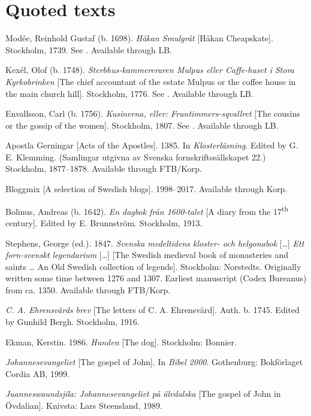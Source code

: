 \documentclass[output=paper]{langscibook}
\begin{document}
\section*{Quoted texts}
\begin{description}[font=\normalfont]\sloppy
\item[1dSMUL:] Modée, Reinhold Gustaf (b. 1698). \textit{Håkan Smulgråt} [Håkan Cheapskate]. Stockholm, 1739. See  \citet{MarttalaStromquist2001}. Available through LB.
\item[2aSTERBH:] Kexél, Olof (b. 1748). \textit{Sterbhus-kammereraren Mulpus eller Caffe-huset i Stora Kyrkobrinken} [The chief accountant of the estate Mulpus or the coffee house in the main church hill]. Stockholm, 1776. See \citet{MarttalaStromquist2001}. Available through LB.
\item[2cKUSINE:] Envallsson, Carl (b. 1756). \textit{Kusinerna, eller: Fruntimmers-sqvallret} [The cousins or the gossip of the women]. Stockholm, 1807. See \citet{MarttalaStromquist2001}. Available through LB.
\item[ApG:] Apostla Gerningar [Acts of the Apostles]. 1385. In \textit{Klosterläsning}. Edited by G. E. Klemming. (Samlingar utgivna av Svenska fornskriftssällskapet 22.) Stockholm, 1877–1878. Available through FTB\slash Korp.
\item[Blogg:] Bloggmix [A selection of Swedish blogs]. 1998–2017. Available through Korp.
\item[Bol:] Bolinus, Andreas (b. 1642). \textit{En dagbok från 1600-talet} [A diary from the 17\textsuperscript{th} century]. Edited by E. Brunnström. Stockholm, 1913. 
\item[Leg:] Stephens, George (ed.). 1847. \textit{Svenska medeltidens kloster- och helgonabok} […] \textit{Ett forn-svenskt legendarium} […] [The Swedish medieval book of monasteries and saints … An Old Swedish collection of legends]. Stockholm: Norstedts. Originally written some time between 1276 and 1307. Earliest manuscript (Codex Bureanus) from ca. 1350. Available through FTB\slash Korp.
\item[Ehrensvärd:] \textit{C. A. Ehrensvärds brev} [The letters of C. A. Ehrensvärd]. Auth. b. 1745. Edited by Gunhild Bergh. Stockholm, 1916.
\item[Hunden:] Ekman, Kerstin. 1986. \textit{Hunden} [The dog]. Stockholm: Bonnier. 
\item[Joh.:] \textit{Johannesevangeliet} [The gospel of John]. In \textit{Bibel 2000}. Gothenburg: Bokförlaget Cordia AB, 1999. 
\item[Jua.:] \textit{Juanneswaundsjila: Johannesevangeliet på älvdalska} [The gospel of John in Övdalian]. Knivsta: Lars Steensland, 1989.

\end{description}
\end{document}
